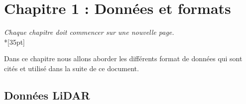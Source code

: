 \chapter{Chapitre 1 : Données et formats}

\begin{center}
	\textit{Chaque chapitre doit commencer sur une nouvelle page.}\\*[35pt]
\end{center}

Dans ce chapitre nous allons aborder les différents format de données qui sont
cités et utilisé dans la suite de ce document.

\section{Données LiDAR}

